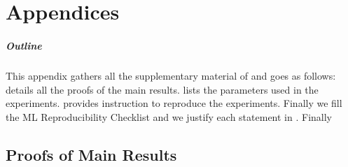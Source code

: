 \chapter{Appendices}
\label{chap:appendix}
\appendix

\paragraph{Outline}

This appendix gathers all the supplementary material of  and goes as follows:  details all the proofs of the main results.  lists the parameters used in the experiments.  provides instruction to reproduce the experiments. Finally we fill the \acrlong{ML} Reproducibility Checklist and we justify each statement in . Finally


\section{Proofs of Main Results}
\label{sec:proofs}

\subsection{}
\label{proof-bellman-expectation}

